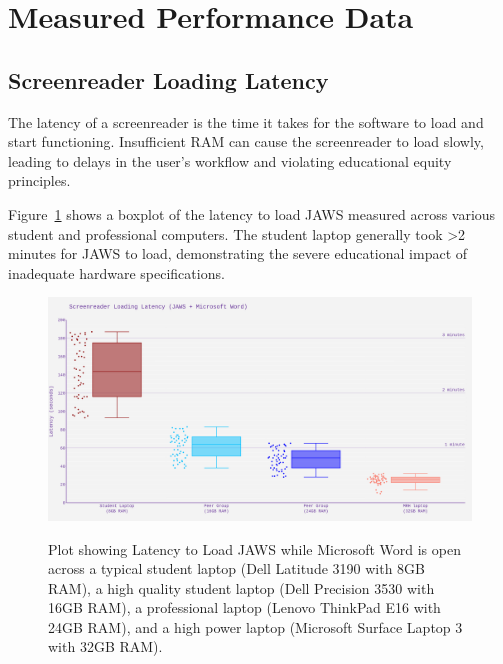 \hypertarget{measured-performance-data}{}\section{Measured Performance Data}\label{measured-performance-data}

\subsection{Screenreader Loading Latency}\label{screenreader-loading-latency}

The latency of a screenreader is the time it takes for the software to load and start functioning. Insufficient RAM can cause the screenreader to load slowly, leading to delays in the user's workflow and violating educational equity principles.

Figure~\ref{fig:figure1} shows a boxplot of the latency to load JAWS measured across various student and professional computers. The student laptop generally took >2 minutes for JAWS to load, demonstrating the severe educational impact of inadequate hardware specifications.

\begin{figure}[htbp]
\centering
{}
\includegraphics[alt={Screen reader load times by RAM configuration showing: 8GB RAM averaging 143 seconds, 16GB RAM averaging 64 seconds, 24GB RAM averaging 49 seconds, and 32GB RAM averaging 25 seconds. The plot demonstrates significantly improved performance with higher RAM configurations.}]{images/ComputerRBDisplaySpecsTVIFig1.png}
\caption[Latency to Load JAWS]{Plot showing Latency to Load JAWS while Microsoft Word is open across a typical student laptop (Dell Latitude 3190 with 8GB RAM), a high quality student laptop (Dell Precision 3530 with 16GB RAM), a professional laptop (Lenovo ThinkPad E16 with 24GB RAM), and a high power laptop (Microsoft Surface Laptop 3 with 32GB RAM).}\label{fig:figure1}
\tagstructend
\end{figure}

